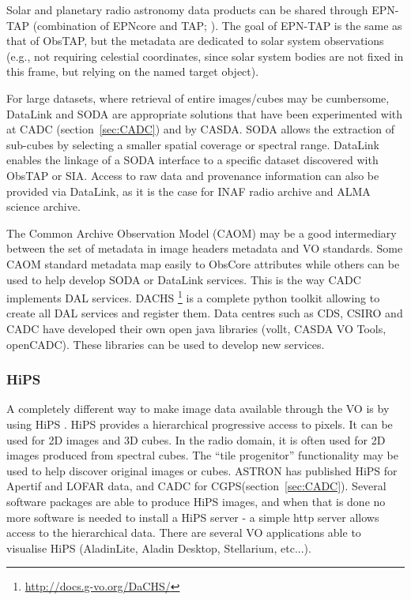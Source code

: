 \documentclass[11pt,a4paper]{ivoa}
\begin{document}
Solar and planetary radio astronomy data products can be shared through EPN-TAP (combination of EPNcore and TAP; \cite{std:EPNTAP}). The goal of EPN-TAP is the same as that of ObsTAP, but the metadata are dedicated to solar system observations (e.g., not requiring celestial coordinates, since solar system bodies are not fixed in this frame, but relying on the named target object).

For large datasets, where retrieval of entire images/cubes may be cumbersome,  DataLink and SODA are appropriate solutions that have been experimented with at CADC (section~\ref{sec:CADC}) and by CASDA. SODA allows the extraction of sub-cubes by selecting a smaller spatial coverage or spectral range. DataLink enables the linkage of a SODA interface to a specific dataset discovered with ObsTAP or SIA. Access to raw data and provenance information can also be provided via DataLink, as it is the case for INAF radio archive and ALMA science archive.

The Common Archive Observation Model (CAOM) may be a good intermediary between the set of metadata in image headers metadata and VO standards. Some CAOM standard metadata map easily to ObsCore attributes while others can be used to help develop SODA or DataLink services. This is the way CADC implements DAL services. DACHS \footnote{\url{http://docs.g-vo.org/DaCHS/}} is a complete python toolkit allowing to create all DAL services and register them. Data centres such as CDS, CSIRO and CADC have developed their own open java libraries (vollt, CASDA VO Tools, openCADC). These libraries can be used to develop new services.


\subsubsection{HiPS}
A completely different way to make image data available through the VO is by using HiPS \citep{2017ivoa.spec.0519F}. HiPS provides a hierarchical progressive access to pixels. It can be used for 2D images and 3D cubes. In the radio domain, it is often used for 2D images produced from spectral cubes. The ``tile progenitor''  functionality may be used to help discover original images or cubes. ASTRON has published HiPS for Apertif and LOFAR data, and CADC for CGPS(section~\ref{sec:CADC}). Several software packages are able to produce HiPS images, and when that is done no more software is needed to install a HiPS server - a simple http server allows access to the hierarchical data. There are several VO applications able to visualise HiPS (AladinLite, Aladin Desktop, Stellarium, etc...). 
\end{document}
